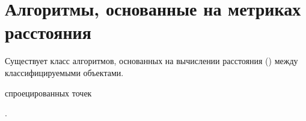 

\section{Алгоритмы, основанные на метриках расстояния}

Существует класс алгоритмов, основанных на вычислении расстояния () между классифицируемыми объектами. 





спроецированных точек 


. 






